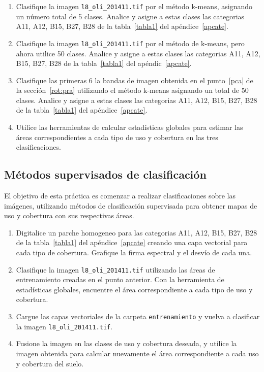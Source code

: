 \documentclass[hidelinks,12pt]{article}
\begin{document}
\begin{enumerate}
    \item Clasifique la imagen \texttt{l8\_oli\_2014\-11.tif} por el método
        k-means, asignando un número total
        de 5 clases. Analice y asigne a estas clases las categorias A11, A12,
        B15, B27, B28 de la tabla~\ref{tabla1} del ap\'endice~\ref{apcate}.
    \item Clasifique la imagen \texttt{l8\_oli\_2014\-11.tif} por el método de
        k-means, pero ahora utilice 50
        clases. Analice y asigne a estas clases las categorias A11, A12,
        B15, B27, B28 de la tabla~\ref{tabla1} del ap\'endic~\ref{apcate}.
    \item Clasifique las primeras 6 la bandas de imagen obtenida en el punto~\ref{pca}
        de la secci\'on~\ref{rot:pra} utilizando el m\'etodo k-means
        asignando un total de 50 clases. Analice y asigne a estas clases las categorias A11, A12,
        B15, B27, B28 de la tabla~\ref{tabla1} del ap\'endice~\ref{apcate}.
    \item Utilice las herramientas de calcular estadísticas globales para
        estimar las áreas correspondientes a cada tipo de uso y cobertura en
        las tres clasificaciones.
\end{enumerate}

\subsection{Métodos supervisados de clasificación}
El objetivo de esta práctica es comenzar a realizar clasificaciones sobre las imágenes, utilizando métodos de clasificación supervisada para obtener
mapas de uso y cobertura con sus respectivas áreas.

\begin{enumerate}
    \item Digitalice un parche homogeneo  para las categorias A11, A12, B15, B27, B28 de la
    tabla~\ref{tabla1} del ap\'endice~\ref{apcate} creando una capa vectorial para
    cada tipo de cobertura. Grafique la firma espectral y el desvío de cada una.
    \item Clasifique la imagen \texttt{l8\_oli\_2014\-11.tif} utilizando las
    áreas de entrenamiento creadas en el punto anterior. Con la herramienta
    de estadísticas globales, encuentre el área correspondiente a cada tipo de uso y
    cobertura.
    \item Cargue las capas vectoriales de la carpeta \texttt{entrenamiento} y
        vuelva a clasificar la imagen \texttt{l8\_oli\_2014\-11.tif}.
    \item Fusione la imagen en las clases de uso y cobertura deseada, y utilice la
    imagen obtenida para calcular nuevamente el área correspondiente a cada uso y
    cobertura del suelo.
\end{enumerate}
\end{document}
